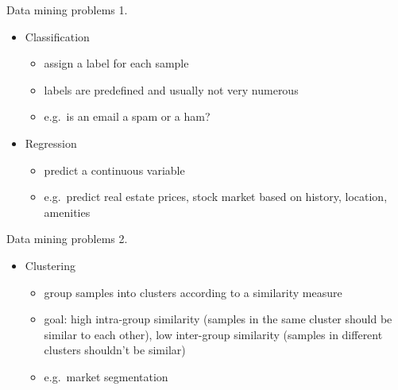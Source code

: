\documentclass[bigger]{beamer}
\begin{document}
\begin{frame}{Data mining problems 1.}
    \begin{itemize}
        \item Classification 
            \begin{itemize}
                \item assign a label for each sample
                \item labels are predefined and usually not very numerous
                \item e.g.~is an email a spam or a ham?
            \end{itemize}
        \item Regression 
            \begin{itemize}
                \item predict a continuous variable
                \item e.g.~predict real estate prices, stock market based on history, location, amenities
            \end{itemize}
    \end{itemize}
\end{frame}

\begin{frame}{Data mining problems 2.}
    \begin{itemize}
        \item Clustering 
            \begin{itemize}
                \item group samples into clusters according to a similarity measure
                \item goal: high intra-group similarity (samples in the same cluster should be similar to each other),
                    low inter-group similarity (samples in different clusters shouldn't be similar)
                \item e.g.~market segmentation
            \end{itemize}
    \end{itemize}
\end{frame}
\end{document}
